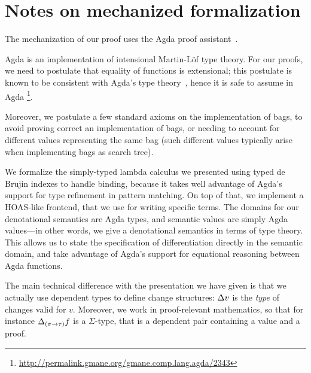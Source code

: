 \section{Notes on mechanized formalization}
\label{sec:formal}

The mechanization of our proof uses the Agda
proof assistant~\citep{agda-head}.

Agda is an implementation of intensional Martin-Löf type theory.
For our proofs, we need to postulate that equality of functions is
extensional; this postulate is known to be consistent with Agda's
type theory~\citep{Hofmann96}, hence it is safe to assume in Agda%
\footnote{\url{http://permalink.gmane.org/gmane.comp.lang.agda/2343}}.

Moreover, we postulate a few standard axioms on the
implementation of bags, to avoid proving correct an
implementation of bags, or needing to account for different
values representing the same bag (such different values typically
arise when implementing bags as search tree).

We formalize the simply-typed lambda calculus we presented using
typed de Brujin indexes to handle binding, because it takes well
advantage of Agda's support for type refinement in pattern
matching. On top of that, we implement a HOAS-like frontend, that
we use for writing specific terms.
The domains for our denotational
semantics are Agda types, and semantic values are simply Agda
values---in other words, we give a denotational semantics in
terms of type theory.
%
This allows us to state the specification of differentiation
directly in the semantic domain, and take advantage of Agda's
support for equational reasoning between Agda functions.

The main technical difference with the presentation we have given
is that we actually use dependent types to define change
structures: $\Change{v}$ is the \emph{type} of changes valid for
$v$. Moreover, we work in proof-relevant mathematics, so that for
instance $\Change[\Fun*{\Gs}{\Gt}]{f}$ is a $\Sigma$-type, that
is a dependent pair containing a value and a proof.
